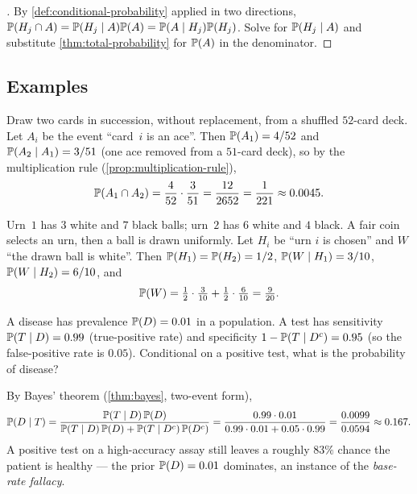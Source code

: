 \begin{proof}[]
By \cref{def:conditional-probability} applied in two directions,
$\mathbb{P}(H_j \cap A) = \mathbb{P}(H_j \mid A) \mathbb{P}(A) = \mathbb{P}(A \mid H_j) \mathbb{P}(H_j)$.
Solve for $\mathbb{P}(H_j \mid A)$ and substitute
\cref{thm:total-probability} for $\mathbb{P}(A)$ in the denominator.
\end{proof}

\subsection*{Examples}

\begin{example}
\label{ex:two-cards}
Draw two cards in succession, without replacement, from a shuffled
$52$-card deck. Let $A_i$ be the event ``card~$i$ is an ace''. Then
$\mathbb{P}(A_1) = 4/52$ and $\mathbb{P}(A_2 \mid A_1) = 3/51$ (one ace
removed from a $51$-card deck), so by the multiplication rule
(\cref{prop:multiplication-rule}),
\[
  \mathbb{P}(A_1 \cap A_2) = \frac{4}{52} \cdot \frac{3}{51} = \frac{12}{2652} = \frac{1}{221} \approx 0.0045.
\]
\end{example}

\begin{example}
\label{ex:two-urns}
Urn~$1$ has $3$ white and $7$ black balls; urn~$2$ has $6$ white and
$4$ black. A fair coin selects an urn, then a ball is drawn
uniformly. Let $H_i$ be ``urn $i$ is chosen'' and $W$ ``the drawn
ball is white''. Then $\mathbb{P}(H_1) = \mathbb{P}(H_2) = 1/2$,
$\mathbb{P}(W \mid H_1) = 3/10$, $\mathbb{P}(W \mid H_2) = 6/10$, and
\[
  \mathbb{P}(W) = \tfrac{1}{2} \cdot \tfrac{3}{10} + \tfrac{1}{2} \cdot \tfrac{6}{10} = \tfrac{9}{20}.
\]
\end{example}

\begin{example}
\label{ex:medical-test}
A disease has prevalence $\mathbb{P}(D) = 0.01$ in a population. A test
has sensitivity $\mathbb{P}(T \mid D) = 0.99$ (true-positive rate) and
specificity $1 - \mathbb{P}(T \mid D^c) = 0.95$ (so the false-positive
rate is $0.05$). Conditional on a positive test, what is the
probability of disease?

By Bayes' theorem (\cref{thm:bayes}, two-event form),
\[
  \mathbb{P}(D \mid T) = \frac{\mathbb{P}(T \mid D)\, \mathbb{P}(D)}{\mathbb{P}(T \mid D)\, \mathbb{P}(D) + \mathbb{P}(T \mid D^c)\, \mathbb{P}(D^c)}
  = \frac{0.99 \cdot 0.01}{0.99 \cdot 0.01 + 0.05 \cdot 0.99}
  = \frac{0.0099}{0.0594} \approx 0.167.
\]
A positive test on a high-accuracy assay still leaves a roughly
$83\%$ chance the patient is healthy — the prior $\mathbb{P}(D) = 0.01$
dominates, an instance of the \emph{base-rate fallacy}.
\end{example}

